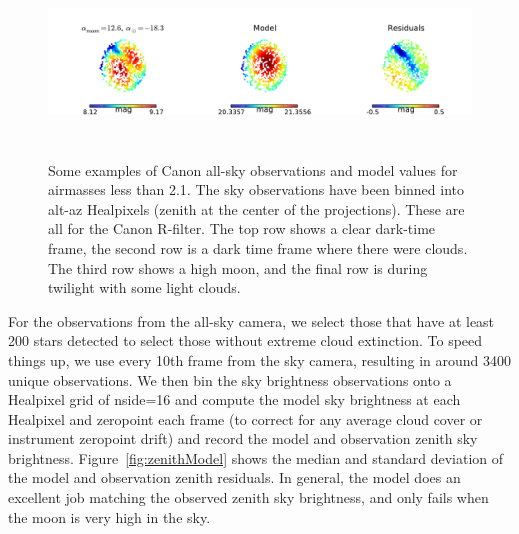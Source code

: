 \documentclass[]{spie}
\begin{document}
\begin{figure}[ht]
\begin{center}
  \includegraphics[height=5cm]{plots/exampleSkys_3.pdf}
  \end{center}
  \caption{Some examples of Canon all-sky observations and model values for airmasses less than 2.1. The sky observations have been binned into alt-az Healpixels (zenith at the center of the projections). These are all for the Canon R-filter. The top row shows a clear dark-time frame, the second row is a dark time frame where there were clouds. The third row shows a high moon, and the final row is during twilight with some light clouds. \label{fig:skyExamples}}
\end{figure}


For the observations from the all-sky camera, we select those that have at least 200 stars detected to select those without extreme cloud extinction. To speed things up, we use every 10th frame from the sky camera, resulting in around 3400 unique observations.  We then bin the sky brightness observations onto a Healpixel grid of nside=16 and compute the model sky brightness at each Healpixel and zeropoint each frame (to correct for any average cloud cover or instrument zeropoint drift) and record the model and observation zenith sky brightness. Figure~\ref{fig:zenithModel} shows the median and standard deviation of the model and observation zenith residuals.  In general, the model does an excellent job matching the observed zenith sky brightness, and only fails when the moon is very high in the sky.  
\end{document}
